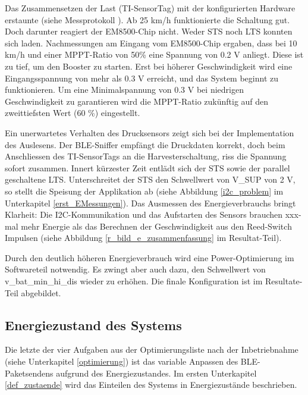 Das Zusammensetzen der Last (TI-SensorTag) mit der konfigurierten Hardware erstaunte (siehe Messprotokoll \cite{messung_inbetrieb_prototyp}). Ab 25 km/h funktionierte die Schaltung gut. Doch darunter reagiert der EM8500-Chip nicht. Weder STS noch LTS konnten sich laden. Nachmessungen am Eingang vom EM8500-Chip ergaben, dass bei  10 km/h und einer MPPT-Ratio von 50\thinspace\% eine Spannung von 0.2 V anliegt. Diese ist zu tief, um den Booster zu starten. Erst bei höherer Geschwindigkeit wird eine Eingangsspannung von mehr als 0.3 V erreicht, und das System beginnt zu funktionieren. Um eine Minimalspannung von 0.3 V bei niedrigen Geschwindigkeit zu garantieren wird die MPPT-Ratio zukünftig auf den zweittiefsten Wert (60 \thinspace\%) eingestellt.

Ein unerwartetes Verhalten des Drucksensors zeigt sich bei der Implementation des Auslesens. Der BLE-Sniffer empfängt die Druckdaten korrekt, doch beim Anschliessen des TI-SensorTags an die Harvesterschaltung, riss die Spannung sofort zusammen. Innert kürzester Zeit entlädt sich der STS sowie der parallel geschaltene LTS. Unterschreitet der STS den Schwellwert von V\_SUP von 2 V, so stellt die Speisung der Applikation ab (siehe Abbildung \ref{i2c_problem} im Unterkapitel \ref{erst_EMessungen}). Das Ausmessen des Energieverbrauchs bringt Klarheit: Die I2C-Kommunikation und das Aufstarten des Sensors brauchen xxx-mal mehr Energie als das Berechnen der Geschwindigkeit aus den Reed-Switch Impulsen (siehe Abbildung \ref{r_bild_e_zusammenfassung} im Resultat-Teil).


Durch den deutlich höheren Energieverbrauch wird eine Power-Optimierung im Softwareteil notwendig. Es zwingt aber auch dazu, den Schwellwert von v\_bat\_min\_hi\_dis  wieder zu erhöhen. Die finale Konfiguration ist im Resultate-Teil abgebildet.


\subsection{Energiezustand des Systems}
\label{v_energiezustand}

Die letzte der vier Aufgaben aus der Optimierungsliste nach der Inbetriebnahme (siehe Unterkapitel \ref{optimierung}) ist das variable Anpassen des BLE-Paketsendens aufgrund des Energiezustandes. Im ersten Unterkapitel \ref{def_zustaende} wird das Einteilen des Systems in Energiezustände beschrieben. %

